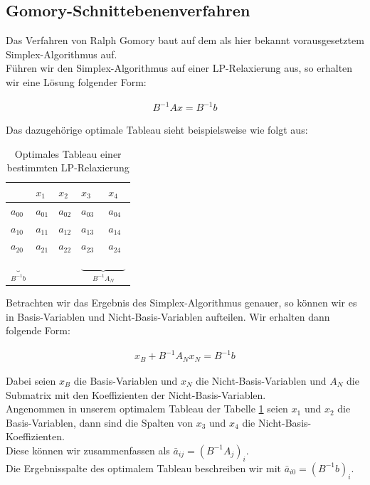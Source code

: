 \documentclass[tog]{acmsiggraph}
\begin{document}
\subsection*{Gomory-Schnittebenenverfahren}

Das Verfahren von Ralph Gomory baut auf dem als hier bekannt vorausgesetztem Simplex-Algorithmus auf.\\
Führen wir den Simplex-Algorithmus auf einer LP-Relaxierung aus, so erhalten wir eine Lösung folgender Form:

\large
\begin{align}
\label{Eq:Simplex}
B^{-1} Ax = B^{-1}b
\end{align}
\normalsize

Das dazugehörige optimale Tableau sieht beispielsweise wie folgt aus:

\begin{table}[ht]
\centering
\caption{Optimales Tableau einer bestimmten LP-Relaxierung}
\label{Tb:Optimales Tableau}
\begin{tabular}{lllll}
& $x_1$ & $x_2$  & $x_3$ & $x_4$ \\
\hline
\multicolumn{1}{|l|}{\large$a_{00}$} & \large$a_{01}$  & \large$a_{02}$ & \large$a_{03}$ & \multicolumn{1}{l|}{\large$a_{04}$} \\ \hline
\multicolumn{1}{|l|}{\large$a_{10}$} & \large$a_{11}$ & \large$a_{12}$ & \large$a_{13}$ & \multicolumn{1}{l|}{\large$a_{14}$} \\
\multicolumn{1}{|l|}{\large$a_{20}$} & \large$a_{21}$ & \large$a_{22}$ & \large$a_{23}$ & \multicolumn{1}{l|}{\large$a_{24}$} \\ \hline               
\large$\underbrace{}_{B^{-1}b}$ &   &   & \multicolumn{2}{l}{\large$\underbrace{\;\;\;\;\;\;\;\;\;\;\;\;\;\;\;\;}_{B^{-1}A_N}$}      
\end{tabular}
\end{table}

Betrachten wir das Ergebnis des Simplex-Algorithmus genauer, so können wir es in Basis-Variablen und Nicht-Basis-Variablen aufteilen. Wir erhalten dann folgende Form:

\large
\begin{align}
\label{Eq:SimplexBasis}
x_B + B^{-1} A_N x_N = B^{-1}b
\end{align}
\normalsize

Dabei seien $x_B$ die Basis-Variablen und $x_N$ die Nicht-Basis-Variablen und $A_N$ die Submatrix mit den Koeffizienten der Nicht-Basis-Variablen.\\
Angenommen in unserem optimalem Tableau der Tabelle \ref{Tb:Optimales Tableau} seien $x_1$ und $x_2$ die Basis-Variablen, dann sind die Spalten von $x_3$ und $x_4$ die Nicht-Basis-Koeffizienten.\\
Diese können wir zusammenfassen als $\bar{a}_{ij} = (B^{-1} A_j)_i$. \\
Die Ergebnisspalte des optimalem Tableau beschreiben wir mit $\bar{a}_{i0} = (B^{-1} b)_i$.
\end{document}
